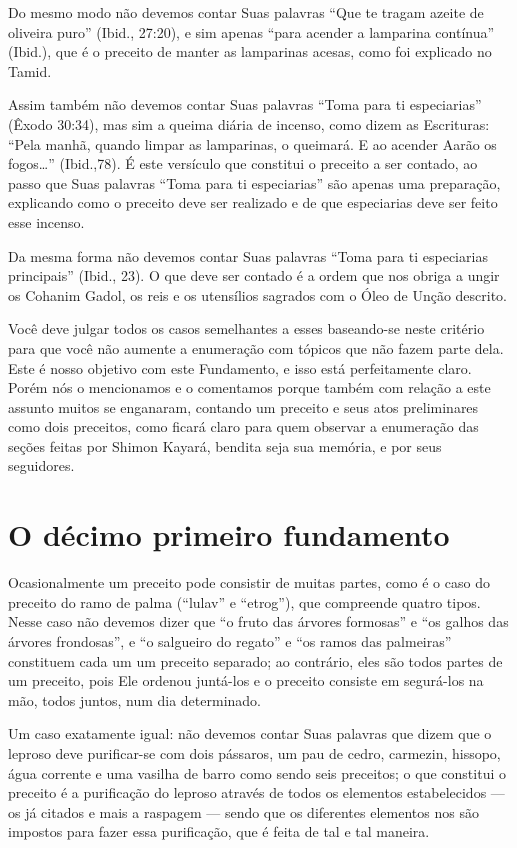 Do mesmo modo não devemos contar Suas palavras ``Que te tragam azeite de
oliveira puro'' (Ibid., 27:20), e sim apenas ``para acender a lamparina
contínua'' (Ibid.), que é o preceito de manter as lamparinas acesas,
como foi explicado no Tamid.

Assim também não devemos contar Suas palavras ``Toma para ti
especiarias'' (Êxodo 30:34), mas sim a queima diária de incenso, como
dizem as Escrituras: ``Pela manhã, quando limpar as lamparinas, o
queimará. E ao acender Aarão os fogos\ldots{}'' (Ibid.,78). É este versículo que constitui o
preceito a ser contado, ao passo que Suas palavras ``Toma para ti
especiarias'' são apenas uma preparação, explicando como o preceito deve
ser realizado e de que especiarias deve ser feito esse incenso.

Da mesma forma não devemos contar Suas palavras ``Toma para ti
especiarias principais'' (Ibid., 23). O que deve ser contado é a ordem
que nos obriga a ungir os Cohanim Gadol, os reis e os utensílios
sagrados com o Óleo de Unção descrito.

Você deve julgar todos os casos semelhantes a esses baseando-se neste
critério para que você não aumente a enumeração com tópicos que não
fazem parte dela. Este é nosso objetivo com este Fundamento, e isso está
perfeitamente claro. Porém nós o mencionamos e o comentamos porque
também com relação a este assunto muitos se enganaram, contando um
preceito e seus atos preliminares como dois preceitos, como ficará
claro para quem observar a enumeração das seções feitas por Shimon
Kayará, bendita seja sua memória, e por seus seguidores.

\chapter*{O décimo primeiro fundamento}

Ocasionalmente um preceito pode consistir de muitas partes, como é o
caso do preceito do ramo de palma (``lulav'' e ``etrog''), que
compreende quatro tipos. Nesse caso não devemos dizer que ``o fruto das
árvores formosas'' e ``os galhos das árvores frondosas'', e ``o
salgueiro do regato'' e ``os ramos das palmeiras'' constituem cada um
um preceito separado; ao contrário, eles são todos partes de um
preceito, pois Ele ordenou juntá-los e o preceito consiste em segurá-los
na mão, todos juntos, num dia determinado.

Um caso exatamente igual: não devemos contar Suas palavras que dizem que
o leproso deve purificar-se com dois pássaros, um pau de cedro,
carmezin, hissopo, água corrente e uma vasilha de barro como sendo seis
preceitos; o que constitui o preceito é a purificação do leproso
através de todos os elementos estabelecidos --- os já citados e mais a
raspagem --- sendo que os diferentes elementos nos são impostos para
fazer essa purificação, que é feita de tal e tal maneira.

